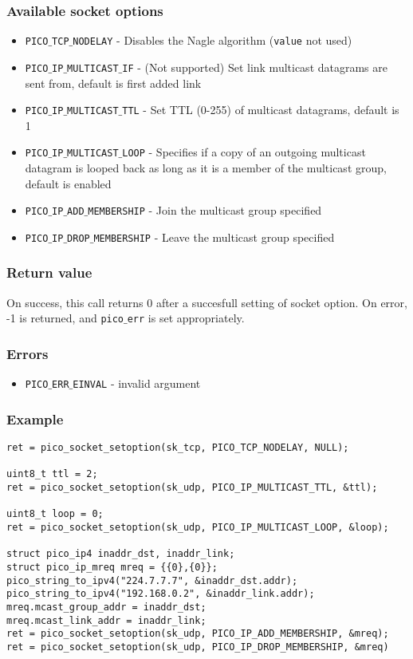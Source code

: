 \subsubsection*{Available socket options}
\begin{itemize}[noitemsep]
\item \texttt{PICO$\_$TCP$\_$NODELAY} - Disables the Nagle algorithm (\texttt{value} not used)
\item \texttt{PICO$\_$IP$\_$MULTICAST$\_$IF} - (Not supported) Set link multicast datagrams are sent from, default is first added link
\item \texttt{PICO$\_$IP$\_$MULTICAST$\_$TTL} - Set TTL (0-255) of multicast datagrams, default is 1
\item \texttt{PICO$\_$IP$\_$MULTICAST$\_$LOOP} - Specifies if a copy of an outgoing multicast datagram is looped back as long as it is a member of the multicast group, default is enabled
\item \texttt{PICO$\_$IP$\_$ADD$\_$MEMBERSHIP} - Join the multicast group specified
\item \texttt{PICO$\_$IP$\_$DROP$\_$MEMBERSHIP} - Leave the multicast group specified
\end{itemize}

\subsubsection*{Return value}
On success, this call returns 0 after a succesfull setting of socket option.
On error, -1 is returned, and \texttt{pico$\_$err} is set appropriately.

\subsubsection*{Errors}
\begin{itemize}[noitemsep]
\item \texttt{PICO$\_$ERR$\_$EINVAL} - invalid argument
\end{itemize}

\subsubsection*{Example}
\begin{verbatim}
ret = pico_socket_setoption(sk_tcp, PICO_TCP_NODELAY, NULL);

uint8_t ttl = 2;
ret = pico_socket_setoption(sk_udp, PICO_IP_MULTICAST_TTL, &ttl);

uint8_t loop = 0;
ret = pico_socket_setoption(sk_udp, PICO_IP_MULTICAST_LOOP, &loop);

struct pico_ip4 inaddr_dst, inaddr_link;
struct pico_ip_mreq mreq = {{0},{0}};
pico_string_to_ipv4("224.7.7.7", &inaddr_dst.addr);
pico_string_to_ipv4("192.168.0.2", &inaddr_link.addr);
mreq.mcast_group_addr = inaddr_dst;
mreq.mcast_link_addr = inaddr_link;
ret = pico_socket_setoption(sk_udp, PICO_IP_ADD_MEMBERSHIP, &mreq);
ret = pico_socket_setoption(sk_udp, PICO_IP_DROP_MEMBERSHIP, &mreq)
\end{verbatim}


